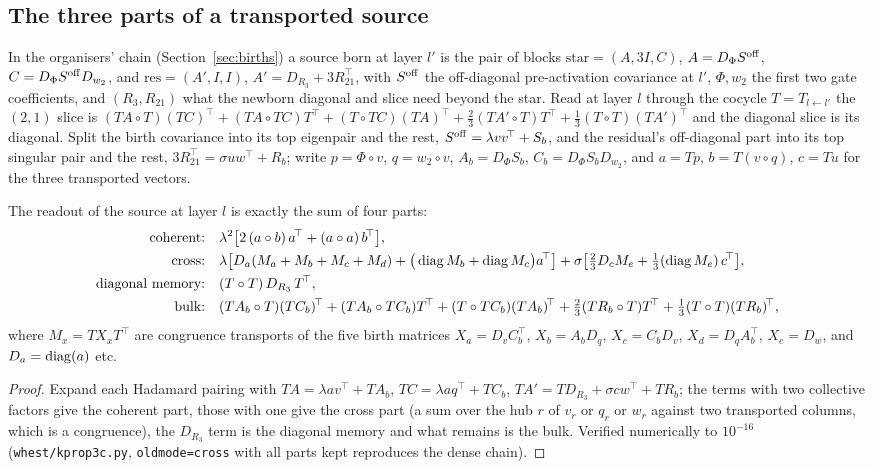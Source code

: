 \subsection{The three parts of a transported source}
In the organisers' chain (Section~\ref{sec:births}) a source born at layer $l'$ is the pair of blocks
$\mathrm{star}=(A,3I,C)$, $A=D_\Phi S^{\rm off}$, $C=D_\Phi S^{\rm off}D_{w_2}$, and $\mathrm{res}=(A',I,I)$,
$A'=D_{R_3}+3R_{21}^{\!\top}$, with $S^{\rm off}$ the off-diagonal pre-activation covariance at $l'$, $\Phi,w_2$ the
first two gate coefficients, and $(R_3,R_{21})$ what the newborn diagonal and slice need beyond the star. Read at
layer $l$ through the cocycle $T=T_{l\leftarrow l'}$ the $(2,1)$ slice is
$(TA\circ T)(TC)^{\!\top}+(TA\circ TC)T^{\!\top}+(T\circ TC)(TA)^{\!\top}+\tfrac23(TA'\circ T)T^{\!\top}+\tfrac13(T\circ T)(TA')^{\!\top}$
and the diagonal slice is its diagonal. Split the birth covariance into its top eigenpair and the rest,
$S^{\rm off}=\lambda vv^{\!\top}+S_b$, and the residual's off-diagonal part into its top singular pair and the rest,
$3R_{21}^{\!\top}=\sigma uw^{\!\top}+R_b$; write $p=\Phi\circ v$, $q=w_2\circ v$, $A_b=D_\Phi S_b$,
$C_b=D_\Phi S_bD_{w_2}$, and $a=Tp$, $b=T(v\circ q)$, $c=Tu$ for the three transported vectors.

\begin{proposition}\label{prop:parts}
The readout of the source at layer $l$ is exactly the sum of four parts:
\begin{align*}
\text{coherent:}\quad&\lambda^2\big[2\,(a\circ b)\,a^{\!\top}+(a\circ a)\,b^{\!\top}\big],\\
\text{cross:}\quad&\lambda\big[D_a(M_a+M_b+M_c+M_d)+\big(\diag M_b+\diag M_c\big)a^{\!\top}\big]
 +\sigma\big[\tfrac23D_cM_e+\tfrac13(\diag M_e)\,c^{\!\top}\big],\\
\text{diagonal memory:}\quad&(T\circ T)\,D_{R_3}\,T^{\!\top},\\
\text{bulk:}\quad&(TA_b\circ T)(TC_b)^{\!\top}+(TA_b\circ TC_b)T^{\!\top}+(T\circ TC_b)(TA_b)^{\!\top}
 +\tfrac23(TR_b\circ T)T^{\!\top}+\tfrac13(T\circ T)(TR_b)^{\!\top},
\end{align*}
where $M_x=TX_xT^{\!\top}$ are congruence transports of the five birth matrices
$X_a=D_vC_b^{\!\top}$, $X_b=A_bD_q$, $X_c=C_bD_v$, $X_d=D_qA_b^{\!\top}$, $X_e=D_w$, and $D_a=\operatorname{diag}(a)$ etc.
\end{proposition}
\begin{proof}
Expand each Hadamard pairing with $TA=\lambda av^{\!\top}+TA_b$, $TC=\lambda aq^{\!\top}+TC_b$,
$TA'=TD_{R_3}+\sigma cw^{\!\top}+TR_b$; the terms with two collective factors give the coherent part, those with one
give the cross part (a sum over the hub $r$ of $v_r$ or $q_r$ or $w_r$ against two transported columns, which is a
congruence), the $D_{R_3}$ term is the diagonal memory and what remains is the bulk. Verified numerically to
$10^{-16}$ (\texttt{whest/kprop3c.py}, \texttt{oldmode=cross} with all parts kept reproduces the dense chain).
\end{proof}

